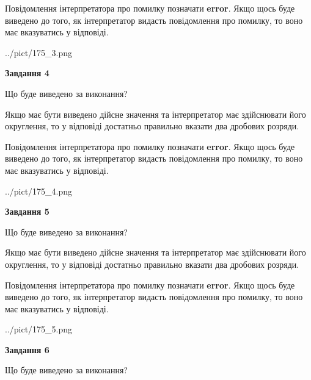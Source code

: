 \documentclass[12pt, ukrainian]{article}
\begin{document}
{\begin {Large}
Повідомлення інтерпретатора про помилку позначати \textbf{error}.
Якщо щось буде виведено до того, як інтерпретатор видасть повідомлення про помилку, 
то воно має вказуватись у відповіді. \par

\begin{center}
	{../pict/175_3.png}
\end{center}
\newpage

{\begin {center}\textbf{Завдання 4}\end {center}}\par
Що буде виведено за виконання? \par

Якщо має бути виведено дійсне значення та інтерпретатор має здійснювати його округлення, 
то у відповіді достатньо правильно вказати два дробових розряди.

Повідомлення інтерпретатора про помилку позначати \textbf{error}.
Якщо щось буде виведено до того, як інтерпретатор видасть повідомлення про помилку, 
то воно має вказуватись у відповіді. \par

\begin{center}
	{../pict/175_4.png}
\end{center}
\newpage

{\begin {center}\textbf{Завдання 5}\end {center}}\par
Що буде виведено за виконання? \par

Якщо має бути виведено дійсне значення та інтерпретатор має здійснювати його округлення, 
то у відповіді достатньо правильно вказати два дробових розряди.

Повідомлення інтерпретатора про помилку позначати \textbf{error}.
Якщо щось буде виведено до того, як інтерпретатор видасть повідомлення про помилку, 
то воно має вказуватись у відповіді. \par

\begin{center}
	{../pict/175_5.png}
\end{center}
\newpage

{\begin {center}\textbf{Завдання 6}\end {center}}\par
Що буде виведено за виконання? \par


\end{Large}}
\end{document}

